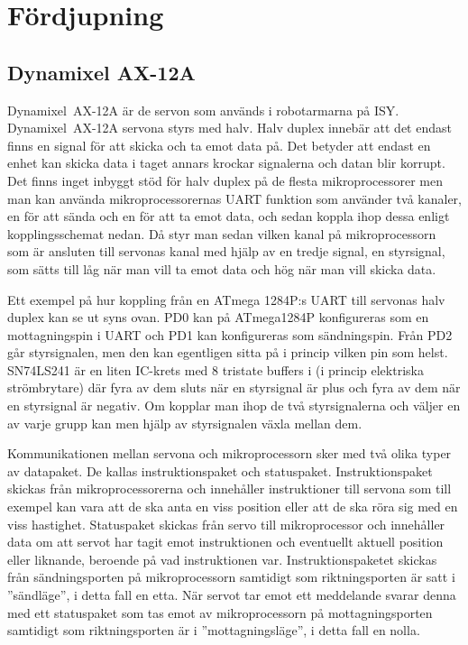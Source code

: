 \documentclass[a4paper,12pt]{article}
\begin{document}
\section{Fördjupning}
 
\subsection{Dynamixel AX-12A}
 
Dynamixel~AX-12A är de servon som används i robotarmarna på ISY. Dynamixel~AX-12A servona styrs med halv. Halv duplex innebär att det endast finns en signal för att skicka och ta emot data på. Det betyder att endast en enhet kan skicka data i taget annars krockar signalerna och datan blir korrupt. Det finns inget inbyggt stöd för halv duplex på de flesta mikroprocessorer men man kan använda mikroprocessorernas UART funktion som använder två kanaler, en för att sända och en för att ta emot data, och sedan koppla ihop dessa enligt kopplingsschemat nedan. Då styr man sedan vilken kanal på mikroprocessorn som är ansluten till servonas kanal med hjälp av en tredje signal, en styrsignal,  som sätts till låg när man vill ta emot data och hög när man vill skicka data. 
 

Ett exempel på hur koppling från en ATmega 1284P:s UART till servonas halv duplex kan se ut syns ovan. PD0 kan på ATmega1284P konfigureras som en mottagningspin i UART och PD1 kan konfigureras som sändningspin. Från PD2 går styrsignalen, men den kan egentligen sitta på i princip vilken pin som helst. SN74LS241 är en liten IC-krets med 8 tristate buffers i (i princip elektriska strömbrytare) där fyra av dem sluts när en styrsignal är plus och fyra av dem när en styrsignal är negativ. Om kopplar man ihop de två styrsignalerna och väljer en av varje grupp kan men hjälp av styrsignalen växla mellan dem.\cite{dyn-manual}
 
Kommunikationen mellan servona och mikroprocessorn sker med två olika typer av datapaket. De kallas instruktionspaket och statuspaket. Instruktionspaket skickas från mikroprocessorerna och innehåller instruktioner till servona som till exempel kan vara att de ska anta en viss position eller att de ska röra sig med en viss hastighet. Statuspaket skickas från servo till mikroprocessor och innehåller data om att servot har tagit emot instruktionen och eventuellt aktuell position eller liknande, beroende på vad instruktionen var. Instruktionspaketet skickas från sändningsporten på mikroprocessorn samtidigt som riktningsporten är satt i ''sändläge'', i detta fall en etta. När servot tar emot ett meddelande svarar denna med ett statuspaket som tas emot av mikroprocessorn på mottagningsporten samtidigt som riktningsporten är i ''mottagningsläge'', i detta fall en nolla. 
\end{document}
